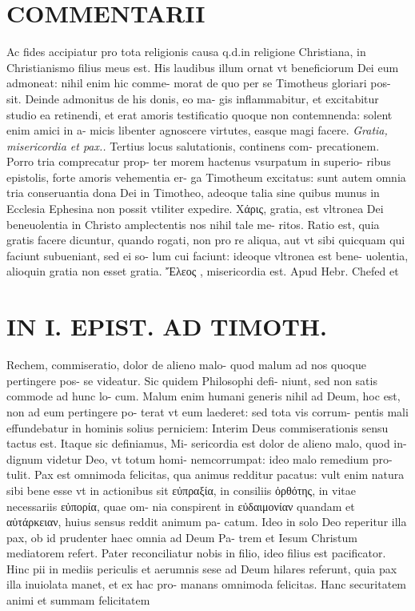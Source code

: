 \documentclass{article}
\begin{document}
\begin{pages}
\section*{COMMENTARII }
\marginpar{[ p.14 ]}\pstart Ac fides accipiatur pro tota religionis causa q.d.in religione Christiana, in Christianismo filius meus est.  \pend\pstart His laudibus illum ornat vt beneficiorum Dei eum admoneat: nihil enim hic comme- morat de quo per se Timotheus gloriari pos- sit. Deinde admonitus de his donis, eo ma- gis inflammabitur, et excitabitur studio ea retinendi, et erat amoris testificatio quoque non contemnenda: solent enim amici in a- micis libenter agnoscere virtutes, easque magi facere.  \pend
\textit{Gratia, misericordia et pax.. }\pstart Tertius locus salutationis, continens com- precationem. Porro tria comprecatur prop- ter morem hactenus vsurpatum in superio- ribus epistolis, forte amoris vehementia er- ga Timotheum excitatus: sunt autem omnia tria conseruantia dona Dei in Timotheo, adeoque talia sine quibus munus in Ecclesia Ephesina non possit vtiliter expedire.  \pend\pstart Xάρις, gratia, est vltronea Dei beneuolentia in Christo amplectentis nos nihil tale me- ritos. Ratio est, quia gratis facere dicuntur, quando rogati, non pro re aliqua, aut vt sibi quicquam qui faciunt subueniant, sed ei so- lum cui faciunt: ideoque vltronea est bene- uolentia, alioquin gratia non esset gratia. Ἔλεος , misericordia est. Apud Hebr. Chefed et  \pend
\section*{IN I. EPIST. AD TIMOTH. }
\marginpar{[ p.15 ]}\pstart Rechem, commiseratio, dolor de alieno malo- quod malum ad nos quoque pertingere pos- se videatur. Sic quidem Philosophi defi- niunt, sed non satis commode ad hunc lo- cum. Malum enim humani generis nihil ad Deum, hoc est, non ad eum pertingere po- terat vt eum laederet: sed tota vis corrum- pentis mali effundebatur in hominis solius perniciem: Interim Deus commiserationis sensu tactus est. Itaque sic definiamus, Mi- sericordia est dolor de alieno malo, quod in- dignum videtur Deo, vt totum homi- nemcorrumpat: ideo malo remedium pro- tulit.  \pend\pstart Pax est omnimoda felicitas, qua animus redditur pacatus: vult enim natura sibi bene esse vt in actionibus sit εὐπραξία, in consiliis ὀρθότης, in vitae necessariis εὐπορία, quae om- nia conspirent in εὐδαιμονίαν quandam et αὐτάρκειαν, huius sensus reddit animum pa- catum. Ideo in solo Deo reperitur illa pax, ob id prudenter haec omnia ad Deum Pa- trem et Iesum Christum mediatorem refert. Pater reconciliatur nobis in filio, ideo filius est pacificator. Hinc pii in mediis periculis et aerumnis sese ad Deum hilares referunt, quia pax illa inuiolata manet, et ex hac pro- manans omnimoda felicitas.  \pend\pstart Hanc securitatem animi et summam felicitatem  \pend

\end{pages}
\end{document}
